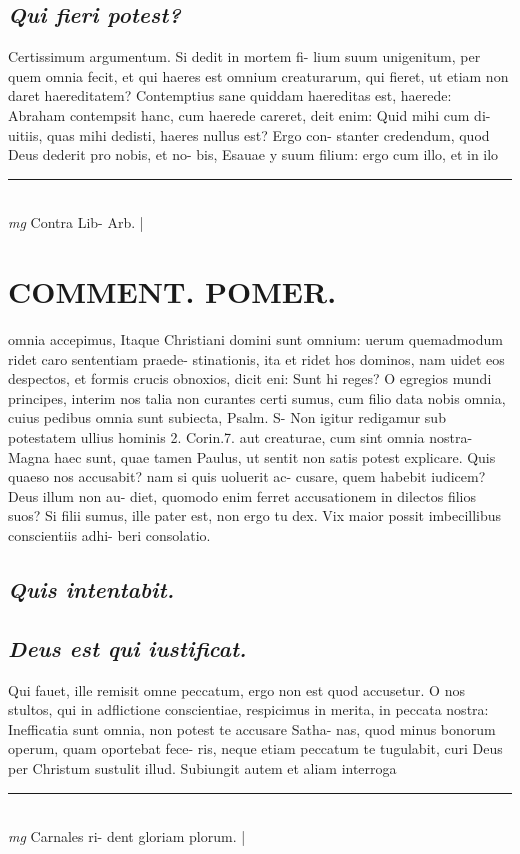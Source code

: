 \documentclass{article}
\begin{document}
\begin{pages}
\subsection*{\textit{Qui fieri potest? }}\pstart Certissimum argumentum. Si dedit in mortem fi- lium suum unigenitum, per quem omnia fecit, et qui haeres est omnium creaturarum, qui fieret, ut etiam non daret haereditatem? Contemptius sane quiddam haereditas est, haerede: Abraham contempsit hanc, cum haerede careret, deit enim: Quid mihi cum di- uitiis, quas mihi dedisti, haeres nullus est? Ergo con- stanter credendum, quod Deus dederit pro nobis, et no- bis, Esauae y suum filium: ergo cum illo, et in ilo  \pend
\vspace{0.5cm}\noindent
\vspace{0.2cm}\rule{1cm}{0.2pt}\\ 
\hspace{0.2cm}\textit{mg}
\footnotesize Contra Lib- Arb.  
\normalsize| 
\section*{COMMENT. POMER.  }\pstart omnia accepimus, Itaque Christiani domini sunt omnium: uerum quemadmodum ridet caro sententiam praede- stinationis, ita et ridet hos dominos, nam uidet eos despectos, et formis crucis obnoxios, dicit eni: Sunt hi reges? O egregios mundi principes, interim nos talia non curantes certi sumus, cum filio data nobis omnia, cuius pedibus omnia sunt subiecta, Psalm. S- Non igitur redigamur sub potestatem ullius hominis 2. Corin.7. aut creaturae, cum sint omnia nostra- Magna haec sunt, quae tamen Paulus, ut sentit non satis potest explicare.  \pend\pstart Quis quaeso nos accusabit? nam si quis uoluerit ac- cusare, quem habebit iudicem? Deus illum non au- diet, quomodo enim ferret accusationem in dilectos filios suos? Si filii sumus, ille pater est, non ergo tu dex. Vix maior possit imbecillibus conscientiis adhi- beri consolatio.   \pend
{}
{}
\subsection*{\textit{Quis intentabit. }}
{}
\subsection*{\textit{Deus est qui iustificat. }}\pstart Qui fauet, ille remisit omne peccatum, ergo non est quod accusetur. O nos stultos, qui in adflictione conscientiae, respicimus in merita, in peccata nostra: Inefficatia sunt omnia, non potest te accusare Satha- nas, quod minus bonorum operum, quam oportebat fece- ris, neque etiam peccatum te tugulabit, curi Deus per Christum sustulit illud. Subiungit autem et aliam interroga  \pend
\vspace{0.5cm}\noindent
\vspace{0.2cm}\rule{1cm}{0.2pt}\\ 
\hspace{0.2cm}\textit{mg}
\footnotesize Carnales ri- dent gloriam plorum.  
\normalsize| 

\end{pages}
\end{document}
